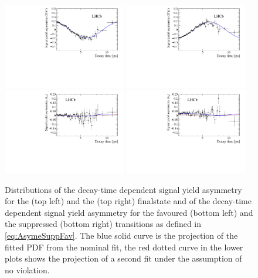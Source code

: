 \begin{figure}[tbp]
    \centering
    \includegraphics[width=0.48\textwidth]{10TimeFit/figs/Asym_f.pdf}
    \includegraphics[width=0.48\textwidth]{10TimeFit/figs/Asym_fbar.pdf}\\
    \includegraphics[width=0.48\textwidth]{10TimeFit/figs/Asym_favour.pdf}
    \includegraphics[width=0.48\textwidth]{10TimeFit/figs/Asym_suppress.pdf}
    \caption{Distributions of the decay-time dependent signal yield asymmetry for the \Dm\pip (top left) and the \Dp\pim (top right) finalstate and of the decay-time dependent signal yield asymmetry for the favoured (bottom left) and the suppressed (bottom right) transitions as defined in \cref{eq:AsymeSuppFav}.
    The blue solid curve is the projection of the fitted PDF from the nominal fit, the red dotted curve in the lower plots shows the projection of a second fit under the assumption of no \CP violation.}
    \label{fig:AsymProjection}
\end{figure}

